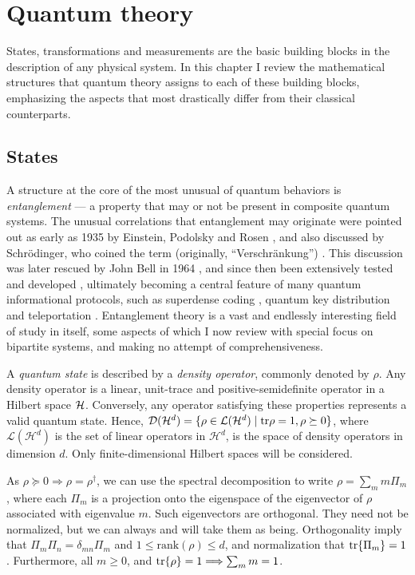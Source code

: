 \chapter{Quantum theory}
\thispagestyle{empty}  %

	States, transformations and measurements are the basic building blocks in the description of any physical system. In this chapter I review the mathematical structures that quantum theory assigns to each of these building blocks, emphasizing the aspects that most drastically differ from their classical counterparts. 

	\section{States}

		A structure at the core of the most unusual of quantum behaviors is \emph{entanglement} --- a property that may or not be present in composite quantum systems. The unusual correlations that entanglement may originate were pointed out as early as 1935 by Einstein, Podolsky and Rosen \cite{epr}, and also discussed by Schrödinger, who coined the term (originally, ``Verschränkung'') \cite{schrodinger_1935}. This discussion was later rescued by John Bell in 1964 \cite{bell_1964}, and since then been extensively tested and developed \cite{horodecki_2009_entanglement}, ultimately becoming a central feature of many quantum informational protocols, such as superdense coding \cite{bennett_1992_superdense}, quantum key distribution \cite{bb84} and teleportation \cite{bennett_1993_teleporting}. Entanglement theory is a vast and endlessly interesting field of study in itself, some aspects of which I now review with special focus on bipartite systems, and making no attempt of comprehensiveness.
	
		A \emph{quantum state} is described by a \emph{density operator}, commonly denoted by $\rho$.  Any density operator is a linear, unit-trace and positive-semidefinite operator in a Hilbert space $\mathcal{H}$. Conversely, any operator satisfying these properties represents a valid quantum state. Hence, $\mathcal{D}(\mathcal{H}^{d}) = \{ \rho \in \mathcal{L}(\mathcal{H}^d) \mid \text{tr}\rho=1, \rho \succeq0 \}$, where $\mathcal{L}(\mathcal{H}^d)$ is the set of linear operators in $\mathcal{H}^d$, is the space of density operators in dimension $d$. Only finite-dimensional Hilbert spaces will be considered.
	
		As $\rho \succeq 0 \Longrightarrow \rho = \rho^\dagger$, we can use the spectral decomposition to write $\rho = \sum_m m \Pi_m$, where each $\Pi_m$ is a projection onto the eigenspace of the eigenvector of $\rho$ associated with eigenvalue $m$. Such eigenvectors are orthogonal. They need not be normalized, but we can always and will take them as being. Orthogonality imply that $\Pi_m \Pi_n = \delta_{mn} \Pi_m$ and $1 \leq \text{rank}(\rho) \leq d$, and normalization that $\tr{\Pi_m} = 1$.  Furthermore, all $m \geq 0$, and $\tr{\rho} = 1 \Longrightarrow \sum_m m = 1$. 
	
